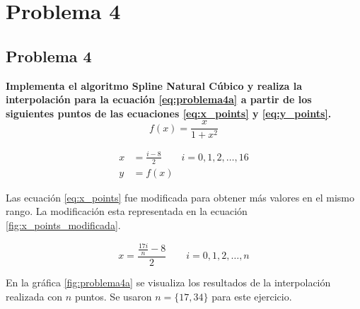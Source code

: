 \section{Problema 4}

\subsection*{Problema 4}

\textbf{Implementa el algoritmo Spline Natural Cúbico y realiza la interpolación para la ecuación \ref{eq:problema4a} a partir de los siguientes puntos de las ecuaciones \ref{eq:x_points} y \ref{eq:y_points}.}
\begin{equation}
	f(x) = \frac{x}{1+x^2} \label{eq:problema4a}
\end{equation}

\begin{align}
	x & = \frac{i-8}{2} \qquad i=0,1,2,\dots,16 \label{eq:x_points} \\
	y & = f(x) \label{eq:y_points}
\end{align}

Las ecuación \ref{eq:x_points} fue modificada para obtener más valores en el mismo rango. La modificación esta representada en la ecuación \ref{fig:x_points_modificada}.

\begin{equation}
	x = \frac{\frac{17i}{n}-8}{2} \qquad i=0,1,2,\dots,n \label{eq:x_points_modificada}
\end{equation}

En la gráfica \ref{fig:problema4a} se visualiza los resultados de la interpolación realizada con $n$ puntos. Se usaron $n=\{17,34\}$ para este ejercicio.

